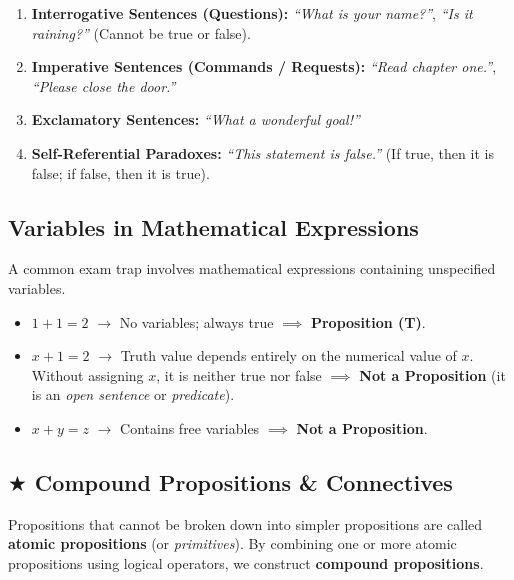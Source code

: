 \documentclass[11pt,a4paper]{article}
\begin{document}
\begin{warningbox}
\begin{enumerate}
    \item \textbf{Interrogative Sentences (Questions):} \textit{``What is your name?''}, \textit{``Is it raining?''} (Cannot be true or false).
    \item \textbf{Imperative Sentences (Commands / Requests):} \textit{``Read chapter one.''}, \textit{``Please close the door.''}
    \item \textbf{Exclamatory Sentences:} \textit{``What a wonderful goal!''}
    \item \textbf{Self-Referential Paradoxes:} \textit{``This statement is false.''} (If true, then it is false; if false, then it is true).
\end{enumerate}
\end{warningbox}

\newpage

\subsection{Variables in Mathematical Expressions}
A common exam trap involves mathematical expressions containing unspecified variables.

\begin{examplebox}
\begin{itemize}
    \item $1 + 1 = 2$ $\longrightarrow$ No variables; always true $\implies$ \textbf{Proposition (T)}.
    \item $x + 1 = 2$ $\longrightarrow$ Truth value depends entirely on the numerical value of $x$. Without assigning $x$, it is neither true nor false $\implies$ \textbf{Not a Proposition} (it is an \textit{open sentence} or \textit{predicate}).
    \item $x + y = z$ $\longrightarrow$ Contains free variables $\implies$ \textbf{Not a Proposition}.
\end{itemize}
\end{examplebox}

\subsection{\texorpdfstring{$\bigstar$ }{*}Compound Propositions \& Connectives}
Propositions that cannot be broken down into simpler propositions are called \textbf{atomic propositions} (or \textit{primitives}). By combining one or more atomic propositions using logical operators, we construct \textbf{compound propositions}.
\end{document}
